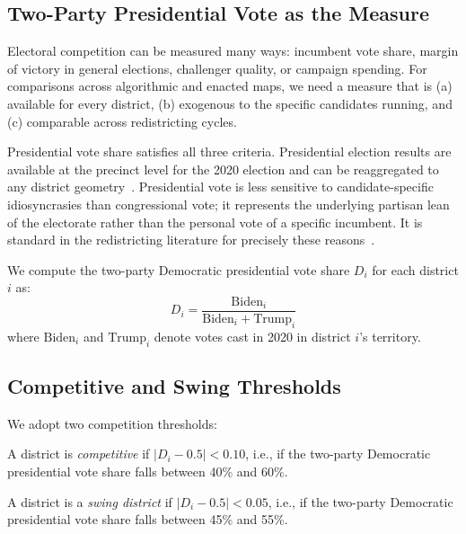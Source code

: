 \label{sec:competition}

\subsection{Two-Party Presidential Vote as the Measure}

Electoral competition can be measured many ways: incumbent vote share,
margin of victory in general elections, challenger quality, or campaign
spending.  For comparisons across algorithmic and enacted maps, we need a
measure that is (a) available for every district, (b) exogenous to the
specific candidates running, and (c) comparable across redistricting cycles.

Presidential vote share satisfies all three criteria.  Presidential election
results are available at the precinct level for the 2020 election and can be
reaggregated to any district geometry~\citep{deford2021redistricting}.
Presidential vote is less sensitive to candidate-specific idiosyncrasies than
congressional vote; it represents the underlying partisan lean of the
electorate rather than the personal vote of a specific incumbent.  It is
standard in the redistricting literature for precisely these
reasons~\citep{gelman1994unified}.

We compute the two-party Democratic presidential vote share $D_i$ for each
district $i$ as:
\begin{equation}
  D_i = \frac{\text{Biden}_i}{\text{Biden}_i + \text{Trump}_i}
\end{equation}
where $\text{Biden}_i$ and $\text{Trump}_i$ denote votes cast in 2020 in
district $i$'s territory.

\subsection{Competitive and Swing Thresholds}

We adopt two competition thresholds:

\begin{definition}
A district is \emph{competitive} if $|D_i - 0.5| < 0.10$, i.e., if the
two-party Democratic presidential vote share falls between 40\% and 60\%.
\end{definition}

\begin{definition}
A district is a \emph{swing district} if $|D_i - 0.5| < 0.05$, i.e., if
the two-party Democratic presidential vote share falls between 45\% and 55\%.
\end{definition}


